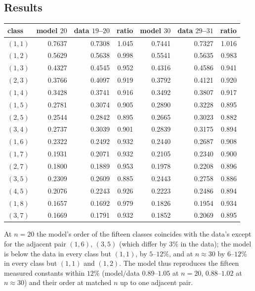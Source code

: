 \documentclass[11pt,a4paper]{article}
\begin{document}
\subsection{Results}\label{s:spresults}
\begin{center}\begin{tabular}{lrrrrrr}\toprule
class & model $20$ & data $19$--$20$ & ratio & model $30$ & data $29$--$31$ & ratio\\\midrule
$(1,1)$ & 0.7637 & 0.7308 & 1.045 & 0.7441 & 0.7327 & 1.016\\
$(1,2)$ & 0.5629 & 0.5638 & 0.998 & 0.5541 & 0.5635 & 0.983\\
$(1,3)$ & 0.4327 & 0.4545 & 0.952 & 0.4316 & 0.4586 & 0.941\\
$(2,3)$ & 0.3766 & 0.4097 & 0.919 & 0.3792 & 0.4121 & 0.920\\
$(1,4)$ & 0.3428 & 0.3741 & 0.916 & 0.3492 & 0.3807 & 0.917\\
$(1,5)$ & 0.2781 & 0.3074 & 0.905 & 0.2890 & 0.3228 & 0.895\\
$(2,5)$ & 0.2544 & 0.2842 & 0.895 & 0.2665 & 0.3023 & 0.882\\
$(3,4)$ & 0.2737 & 0.3039 & 0.901 & 0.2839 & 0.3175 & 0.894\\
$(1,6)$ & 0.2322 & 0.2492 & 0.932 & 0.2440 & 0.2687 & 0.908\\
$(1,7)$ & 0.1931 & 0.2071 & 0.932 & 0.2105 & 0.2340 & 0.900\\
$(2,7)$ & 0.1800 & 0.1889 & 0.953 & 0.1978 & 0.2208 & 0.896\\
$(3,5)$ & 0.2309 & 0.2609 & 0.885 & 0.2443 & 0.2758 & 0.886\\
$(4,5)$ & 0.2076 & 0.2243 & 0.926 & 0.2223 & 0.2486 & 0.894\\
$(1,8)$ & 0.1657 & 0.1692 & 0.979 & 0.1826 & 0.1954 & 0.934\\
$(3,7)$ & 0.1669 & 0.1791 & 0.932 & 0.1852 & 0.2069 & 0.895\\
\bottomrule\end{tabular}\end{center}
At $n=20$ the model's order of the fifteen classes coincides with the data's except for the adjacent pair $(1,6)$, $(3,5)$
(which differ by $3\%$ in the data); the model is below the data in every class but $(1,1)$, by $5$--$12\%$, and at
$n\approx30$ by $6$--$12\%$ in every class but $(1,1)$ and $(1,2)$.  The model thus reproduces the fifteen measured constants
within $12\%$ (model$/$data $0.89$--$1.05$ at $n=20$, $0.88$--$1.02$ at $n\approx30$) and their order at matched $n$ up to one
adjacent pair.
\end{document}
